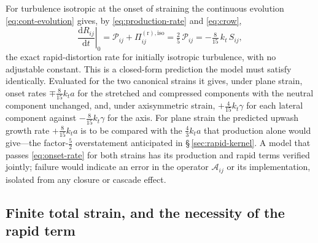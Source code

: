 \documentclass[lineno]{JFM-FLM_Au}
\begin{document}
For turbulence isotropic at the onset of straining the continuous
evolution \eqref{eq:cont-evolution} gives, by
\eqref{eq:production-rate} and \eqref{eq:crow},
\begin{equation}
  \left.\frac{\mathrm{d}R_{ij}}{\mathrm{d}t}\right|_{0}
  = \mathcal{P}_{ij}+\Pi^{(\mathrm r),\mathrm{iso}}_{ij}
  = \tfrac{2}{5}\,\mathcal{P}_{ij}
  = -\tfrac{8}{15}\,k_t\,S_{ij},
  \label{eq:onset-rate}
\end{equation}
the exact rapid-distortion rate for initially isotropic turbulence, with
no adjustable constant. This is a
closed-form prediction the model must satisfy identically. Evaluated for the two canonical strains it gives, under
plane strain, onset rates $\mp\tfrac{8}{15}k_ta$ for the stretched and
compressed components with the neutral component unchanged, and, under
axisymmetric strain, $+\tfrac{4}{15}k_t\gamma$ for each lateral
component against $-\tfrac{8}{15}k_t\gamma$ for the axis. For plane
strain the predicted upwash growth rate $+\tfrac{8}{15}k_ta$ is to be
compared with the $\tfrac43k_ta$ that production alone would give---the
factor-$\tfrac52$ overstatement anticipated in
\S\,\ref{sec:rapid-kernel}. A model that passes \eqref{eq:onset-rate}
for both strains has its production and rapid terms verified jointly;
failure would indicate an error in the operator $\mathcal{A}_{ij}$ or
its implementation, isolated from any closure or cascade effect.

\subsection{Finite total strain, and the necessity of the rapid term}
\label{sec:finite-strain}
\end{document}
